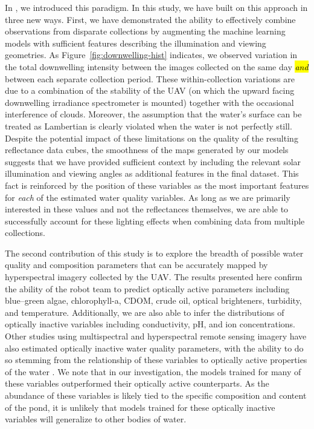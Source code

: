 \documentclass[remotesensing,article,accept,pdftex,moreauthors]{Definitions/mdpi}
\begin{document}
In \cite{robotTeam1}, we introduced this paradigm. In this study, we have built on this approach in three new ways. First, we have demonstrated the ability to effectively combine observations from disparate collections by augmenting the machine learning models with sufficient features describing the illumination and viewing geometries. As Figure~\ref{fig:downwelling-hist} indicates, we observed variation in the total downwelling intensity between the images collected on the same day \textit{\hl{and}} between each separate collection period. These within-collection variations are due to a combination of the stability of the UAV (on which the upward facing downwelling irradiance spectrometer is mounted) together with the occasional interference of clouds. Moreover, the assumption that the water's surface can be treated as Lambertian is clearly violated when the water is not perfectly still. Despite the potential impact of these limitations on the quality of the resulting reflectance data cubes, the smoothness of the maps generated by our models suggests that we have provided sufficient context by including the relevant solar illumination and viewing angles as additional features in the final dataset.  This fact is reinforced by the position of these variables as the most important features for \textit{each} of the estimated water quality variables. As long as we are primarily interested in these values and not the reflectances themselves, we are able to successfully account for these lighting effects when combining data from multiple collections.

The second contribution of this study is to explore the breadth of possible water quality and composition parameters that can be accurately mapped by hyperspectral imagery collected by the UAV. The results presented here confirm the ability of the robot team to predict optically active parameters including blue--green algae, chlorophyll-a, CDOM, crude oil, optical brighteners, turbidity, and temperature. Additionally, we are also able to infer the distributions of optically inactive variables including conductivity, pH, and ion concentrations. Other studies using multispectral and hyperspectral remote sensing imagery have also estimated optically inactive water quality parameters, with the ability to do so stemming from the relationship of these variables to optically active properties of the water \cite{vakili2020determination,guo2021machine,niu2021deep}. We note that in our investigation, the models trained for many of these variables outperformed their optically active counterparts. As the abundance of these variables is likely tied to the specific composition and content of the pond, it is unlikely that models trained for these optically inactive variables will generalize to other bodies of water. 
\end{document}
